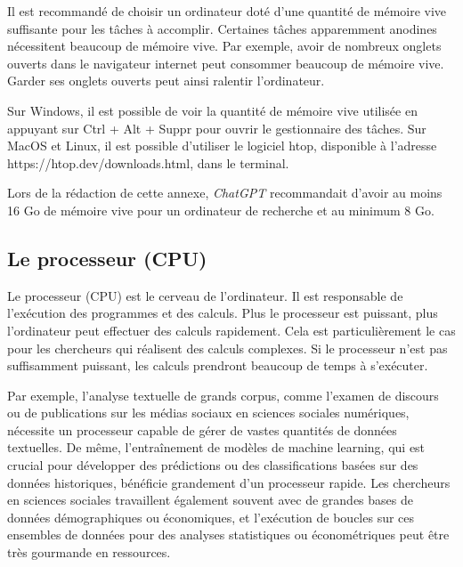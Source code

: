 \documentclass[
  letterpaper,
  DIV=11,
  numbers=noendperiod,
  oneside]{scrreprt}
\begin{document}
Il est recommandé de choisir un ordinateur doté d'une quantité de
mémoire vive suffisante pour les tâches à accomplir. Certaines tâches
apparemment anodines nécessitent beaucoup de mémoire vive. Par exemple,
avoir de nombreux onglets ouverts dans le navigateur internet peut
consommer beaucoup de mémoire vive. Garder ses onglets ouverts peut
ainsi ralentir l'ordinateur.

Sur Windows, il est possible de voir la quantité de mémoire vive
utilisée en appuyant sur Ctrl + Alt + Suppr pour ouvrir le gestionnaire
des tâches. Sur MacOS et Linux, il est possible d'utiliser le logiciel
htop, disponible à l'adresse https://htop.dev/downloads.html, dans le
terminal.

Lors de la rédaction de cette annexe, \emph{ChatGPT} recommandait
d'avoir au moins 16 Go de mémoire vive pour un ordinateur de recherche
et au minimum 8 Go.

\hypertarget{le-processeur-cpu}{%
\subsection{Le processeur (CPU)}\label{le-processeur-cpu}}

Le processeur (CPU) est le cerveau de l'ordinateur. Il est responsable
de l'exécution des programmes et des calculs. Plus le processeur est
puissant, plus l'ordinateur peut effectuer des calculs rapidement. Cela
est particulièrement le cas pour les chercheurs qui réalisent des
calculs complexes. Si le processeur n'est pas suffisamment puissant, les
calculs prendront beaucoup de temps à s'exécuter.

Par exemple, l'analyse textuelle de grands corpus, comme l'examen de
discours ou de publications sur les médias sociaux en sciences sociales
numériques, nécessite un processeur capable de gérer de vastes quantités
de données textuelles. De même, l'entraînement de modèles de machine
learning, qui est crucial pour développer des prédictions ou des
classifications basées sur des données historiques, bénéficie grandement
d'un processeur rapide. Les chercheurs en sciences sociales travaillent
également souvent avec de grandes bases de données démographiques ou
économiques, et l'exécution de boucles sur ces ensembles de données pour
des analyses statistiques ou économétriques peut être très gourmande en
ressources.
\end{document}
